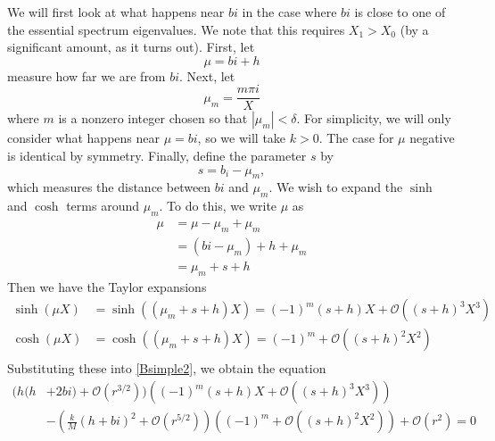 \documentclass[thesis.tex]{subfiles}
\begin{document}
We will first look at what happens near $bi$ in the case where $bi$ is close to one of the essential spectrum eigenvalues. We note that this requires $X_1 > X_0$ (by a significant amount, as it turns out). First, let 
\[
\mu = bi + h
\]
measure how far we are from $bi$. Next, let 
\[
\mu_m = \frac{m \pi i}{X}
\]
where $m$ is a nonzero integer chosen so that $|\mu_m| < \delta$. For simplicity, we will only consider what happens near $\mu = b i$, so we will take $k > 0$. The case for $\mu$ negative is identical by symmetry. Finally, define the parameter $s$ by
\[
s = b_i - \mu_m,
\]
which measures the distance between $bi$ and $\mu_m$. We wish to expand the $\sinh$ and $\cosh$ terms around $\mu_m$. To do this, we write $\mu$ as
\begin{align*}
\mu &= \mu - \mu_m + \mu_m \\
&= (bi - \mu_m) + h + \mu_m \\
&= \mu_m + s + h
\end{align*}
Then we have the Taylor expansions
\begin{align*}
\sinh(\mu X) &= \sinh((\mu_m + s + h)X)
= (-1)^m(s + h)X + \mathcal{O}\left( (s+h)^3 X^3 \right) \\
\cosh(\mu X) &= \cosh((\mu_m + s + h)X)
= (-1)^m + \mathcal{O}\left( (s+h)^2 X^2 \right) \\
\end{align*}
Substituting these into \cref{Bsimple2}, we obtain the equation
\begin{equation}\label{Bsimple3}
\begin{aligned}
( h(h &+ 2 bi) + \mathcal{O}( r^{3/2} ))\left( (-1)^m(s + h)X + \mathcal{O}\left( (s+h)^3 X^3 \right) \right) \\ 
&- \left(\frac{k}{M} (h + bi)^2 + \mathcal{O}( r^{5/2} ) \right)\left( (-1)^m + \mathcal{O}\left( (s+h)^2 X^2 \right) \right) + \mathcal{O}( r^2 ) = 0
\end{aligned}
\end{equation}
\end{document}
